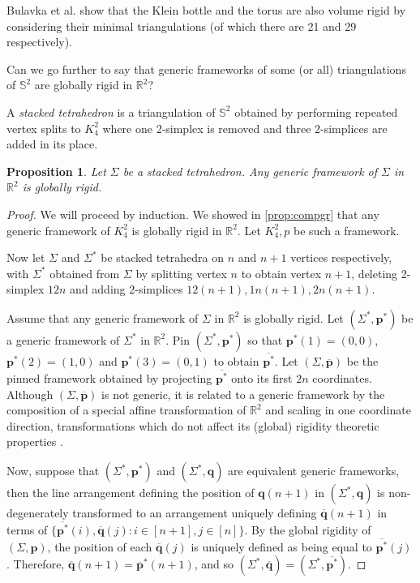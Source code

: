 \documentclass[11pt]{amsart}
\newtheorem{proposition}[theorem]{Proposition}
\theoremstyle{definition}
\theoremstyle{remark}
\newcommand*{\defn}[1]{{\color{purple}\textit{#1}}}
\begin{document}
Bulavka et al. \cite{bulavka2022volume} show that the Klein bottle and the torus are also volume rigid by considering their minimal triangulations (of which there are 21 and 29 respectively).

Can we go further to say that generic frameworks of some (or all) triangulations of $\mathbb{S}^2$ are globally rigid in $\mathbb{R}^2$?

A \defn{stacked tetrahedron} is a triangulation of $\mathbb{S}^2$ obtained by performing repeated vertex splits to $K_4^2$ where one 2-simplex is removed and three 2-simplices are added in its place.

\begin{proposition}\label{lem:stackedtet}
    Let $\Sigma$ be a stacked tetrahedron.
    Any generic framework of $\Sigma$ in $\mathbb{R}^2$ is globally rigid. 
\end{proposition}

\begin{proof}
    We will proceed by induction.
    We showed in \cref{prop:compgr} that any generic framework of $K_4^2$ is globally rigid in $\mathbb{R}^2$.
    Let $K_4^2,p$ be such a framework.

    Now let $\Sigma$ and $\Sigma^*$ be stacked tetrahedra on $n$ and $n+1$ vertices respectively, with $\Sigma^*$ obtained from $\Sigma$ by splitting vertex $n$ to obtain vertex $n+1$, deleting 2-simplex $12n$ and adding 2-simplices $12(n+1), 1n(n+1), 2n(n+1)$.

    Assume that any generic framework of $\Sigma$ in $\mathbb{R}^2$ is globally rigid. Let $(\Sigma^*,\mathbf{p}^*)$ be a generic framework of $\Sigma^*$ in $\mathbb{R}^2$.
    Pin $(\Sigma^*,\mathbf{p}^*)$ so that $\mathbf{p}^*(1)=(0,0)$, $\mathbf{p}^*(2)=(1,0)$ and $\mathbf{p}^*(3)=(0,1)$ to obtain $\overline{\mathbf{p}^*}$.
    Let $(\Sigma,\overline{\mathbf{p}})$ be the pinned framework obtained by projecting $\overline{\mathbf{p}^*}$ onto its first $2n$ coordinates.
    Although $(\Sigma,\overline{\mathbf{p}})$ is not generic, it is related to a generic framework by the composition of a special affine transformation of $\mathbb{R}^2$ and scaling in one coordinate direction, transformations which do not affect its (global) rigidity theoretic properties \cite[p. 56]{southgate2024volume}.

    Now, suppose that $(\Sigma^*,\mathbf{p}^*)$ and $(\Sigma^*,\mathbf{q})$ are equivalent generic frameworks, then the line arrangement defining the position of $\mathbf{q}(n+1)$ in $(\Sigma^*,\mathbf{q})$ is non-degenerately transformed to an arrangement uniquely defining $\overline{\mathbf{q}}(n+1)$ in terms of $\{\overline{\mathbf{p}^*}(i),\overline{\mathbf{q}}(j):i\in [n+1], j\in [n]\}$.
    By the global rigidity of $(\Sigma,\mathbf{p})$, the position of each $\overline{\mathbf{q}}(j)$ is uniquely defined as being equal to $\overline{\mathbf{p}^*}(j)$.
    Therefore, $\overline{\mathbf{q}}(n+1)=\overline{\mathbf{p}}^*(n+1)$, and so $(\Sigma^*,\overline{\mathbf{q}})=(\Sigma^*,\overline{\mathbf{p}^*})$.
\end{proof}
\end{document}
